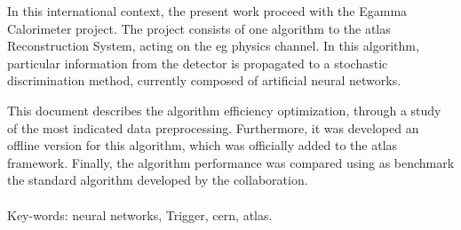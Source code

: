 In this international context, the present work proceed with the Egamma
Calorimeter project. The project consists of one algorithm to the
\gls{atlas} Reconstruction System, acting on the \acrshort{eg} physics channel. In this
algorithm, particular information from the detector is propagated to a stochastic
discrimination method, currently composed of artificial neural networks.

This document describes the algorithm efficiency optimization, through a study
of the most indicated data preprocessing. Furthermore, it was developed an
offline version for this algorithm, which was officially added to the
\gls{atlas} framework. Finally, the algorithm performance was compared using as benchmark
the standard algorithm developed by the collaboration.


\paragraph*{}

\noindent Key-words: neural networks, Trigger, \acrshort{cern}, \acrshort{atlas}.


\vfill
